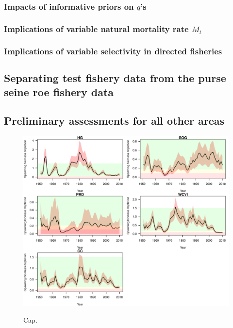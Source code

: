 		\subsubsection{Impacts of informative priors on $q$'s}
		\subsubsection{Implications of variable natural mortality rate $M_t$}
		\subsubsection{Implications of variable selectivity in directed fisheries}
	\subsection{Separating test fishery data from the purse seine roe fishery data}
	\subsection{Preliminary assessments for all other areas}
	
\begin{figure}[!tbp]
	\includegraphics[width=\textwidth]{../Figs/figSBmcmc.pdf}\\
	\caption{Cap.}\label{label}
\end{figure}
